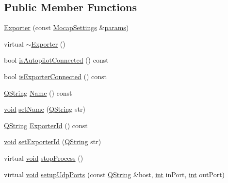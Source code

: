 \subsection*{Public Member Functions}
\begin{DoxyCompactItemize}
\item 
\hyperlink{group___mo_cap_plugin_ga3c11abedc19c26ed0e0212e152f10685}{Exporter} (const \hyperlink{group___mo_cap_plugin_ga6083347a5b3eb70e360f599354dc0f0b}{Mocap\-Settings} \&\hyperlink{glext_8h_afeb6390ab3bc8a0e96a88aff34d52288}{params})
\item 
virtual \hyperlink{group___mo_cap_plugin_ga44f24686958e01a543fd8b68b392658a}{$\sim$\-Exporter} ()
\item 
bool \hyperlink{group___mo_cap_plugin_gaec7e0cea763639d6f79c4f61e9e78375}{is\-Autopilot\-Connected} () const 
\item 
bool \hyperlink{group___mo_cap_plugin_gad9cd5c117dc3025d1ef55ba560b9e7c4}{is\-Exporter\-Connected} () const 
\item 
\hyperlink{group___u_a_v_objects_plugin_gab9d252f49c333c94a72f97ce3105a32d}{Q\-String} \hyperlink{group___mo_cap_plugin_gaad282295f6b9ba8910db1a11c56d1998}{Name} () const 
\item 
\hyperlink{group___u_a_v_objects_plugin_ga444cf2ff3f0ecbe028adce838d373f5c}{void} \hyperlink{group___mo_cap_plugin_ga09d765021a9a03276d14769f3ab7c43d}{set\-Name} (\hyperlink{group___u_a_v_objects_plugin_gab9d252f49c333c94a72f97ce3105a32d}{Q\-String} str)
\item 
\hyperlink{group___u_a_v_objects_plugin_gab9d252f49c333c94a72f97ce3105a32d}{Q\-String} \hyperlink{group___mo_cap_plugin_gaebb24e563941debf0abc1897ef3c89e3}{Exporter\-Id} () const 
\item 
\hyperlink{group___u_a_v_objects_plugin_ga444cf2ff3f0ecbe028adce838d373f5c}{void} \hyperlink{group___mo_cap_plugin_gaf8c44fde7b72a5f5658d47408b806b62}{set\-Exporter\-Id} (\hyperlink{group___u_a_v_objects_plugin_gab9d252f49c333c94a72f97ce3105a32d}{Q\-String} str)
\item 
virtual \hyperlink{group___u_a_v_objects_plugin_ga444cf2ff3f0ecbe028adce838d373f5c}{void} \hyperlink{group___mo_cap_plugin_gad00fa0512ade28ce7c6e08f2e4254b59}{stop\-Process} ()
\item 
virtual \hyperlink{group___u_a_v_objects_plugin_ga444cf2ff3f0ecbe028adce838d373f5c}{void} \hyperlink{group___mo_cap_plugin_ga8790a68ca0c9e28691948cb19eba005d}{setup\-Udp\-Ports} (const \hyperlink{group___u_a_v_objects_plugin_gab9d252f49c333c94a72f97ce3105a32d}{Q\-String} \&host, \hyperlink{ioapi_8h_a787fa3cf048117ba7123753c1e74fcd6}{int} in\-Port, \hyperlink{ioapi_8h_a787fa3cf048117ba7123753c1e74fcd6}{int} out\-Port)

\end{DoxyCompactItemize}
